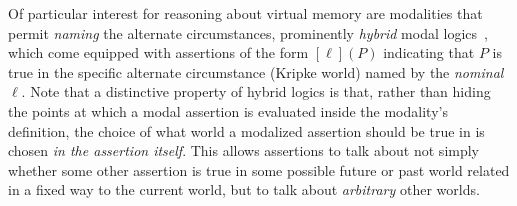 
Of particular interest for reasoning about virtual memory are modalities that permit \emph{naming} the alternate 
circumstances, prominently \emph{hybrid} modal logics~\cite{blackburn1995hybrid,areces2001hybrid}, which come equipped 
with assertions of the form $[\ell](P)$ indicating that $P$ is true in the specific alternate circumstance (Kripke world)
 named by the \emph{nominal} $\ell$. Note that a distinctive property of hybrid logics is that, rather than hiding
the points at which a modal assertion is evaluated inside the modality's definition, the choice of what world a modalized
assertion should be true in is chosen \emph{in the assertion itself}. This allows assertions to talk about not simply whether some other assertion
is true in some possible future or past world related in a fixed way to the current world, but to talk about \emph{arbitrary}
other worlds.

